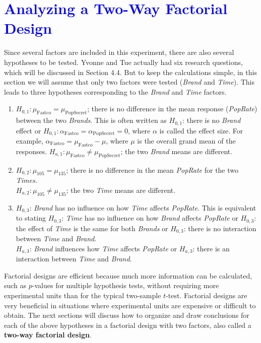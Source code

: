 \documentclass[
]{report}
\begin{document}
\hypertarget{section-41}{%
\section{\texorpdfstring{\textcolor{blue}{Analyzing a Two-Way Factorial Design}}{}}\label{section-41}}

Since several factors are included in this experiment, there are also several hypotheses to be tested. Yvonne and Tue actually had six research questions, which will be discussed in Section 4.4. But to keep the calculations simple, in this section we will assume that only two factors were tested (\emph{Brand} and \emph{Time}). This leads to three hypotheses corresponding to the \emph{Brand} and \emph{Time} factors.

\begin{enumerate}
\def\labelenumi{\arabic{enumi}.}
\item
  \(H_{0,1}: \mu_{\text{Fastco}} = \mu_{\text{PopSecret}}\); there is no difference in the mean response (\emph{PopRate}) between the two \emph{Brands}. This is often written as \(H_{0,1}\): there is no \emph{Brand} effect or \(H_{0,1}: \alpha_{\text{Fastco}} = \alpha_{\text{PopSecret}} = 0\), where \(\alpha\) is called the effect size. For example, \(\alpha_{\text{Fastco}} = \mu_{\text{Fastco}} - \mu\), where \(\mu\) is the overall grand mean of the responses.
  \(H_{a,1}: \mu_{\text{Fastco}} \ne \mu_{\text{PopSecret}}\); the two \emph{Brand} means are different.
\item
  \(H_{0,2}: \mu_{105} = \mu_{135}\); there is no difference in the mean \emph{PopRate} for the two \emph{Times}.\\
  \(H_{a,2}: \mu_{105} \ne \mu_{135}\); the two \emph{Time} means are different.
\item
  \(H_{0,3}\): \emph{Brand} has no influence on how \emph{Time} affects \emph{PopRate}. This is equivalent to stating \(H_{0,3}\): \emph{Time} has no influence on how \emph{Brand} affects \emph{PopRate} or \(H_{0,3}\): the effect of \emph{Time} is the same for both \emph{Brands} or \(H_{0,3}\): there is no interaction between \emph{Time} and \emph{Brand}.\\
  \(H_{a,3}\): \emph{Brand} influences how \emph{Time} affects \emph{PopRate} or \(H_{a,3}\): there is an interaction between \emph{Time} and \emph{Brand}.
\end{enumerate}

Factorial designs are efficient because much more information can be calculated, such as \(\scriptstyle p\)-values for multiple hypothesis tests, without requiring more experimental units than for the typical two-sample \(\scriptstyle t\)-test. Factorial designs are very beneficial in situations where experimental units are expensive or difficult to obtain. The next sections will discuss how to organize and draw conclusions for each of the above hypotheses in a factorial design with two factors, also called a \textbf{two-way factorial design}.
\end{document}
